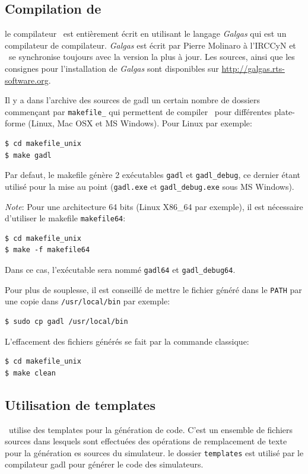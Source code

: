 \subsection{Compilation de \gadl}
le compilateur \gadl\ est entièrement écrit en utilisant le langage \emph{Galgas} qui est un compilateur de compilateur. \emph{Galgas} est écrit par Pierre Molinaro à l'IRCCyN et \gadl\ se synchronise toujours avec la version la plus à jour. Les sources, ainsi que les consignes pour l'installation de \emph{Galgas} sont disponibles sur \url{http://galgas.rts-software.org}.

Il y a dans l'archive des sources de gadl un certain nombre de dossiers commençant par \texttt{makefile\_} qui permettent de compiler \gadl\ pour différentes plate-forme (Linux, Mac OSX et MS Windows). Pour Linux par exemple:
\begin{verbatim}
$ cd makefile_unix
$ make gadl
\end{verbatim}
Par defaut, le makefile génère 2 exécutables \texttt{gadl} et \texttt{gadl\_debug}, ce dernier étant utilisé pour la mise au point (\texttt{gadl.exe} et \texttt{gadl\_debug.exe} sous MS Windows).

\emph{Note}: Pour une architecture 64 bits (Linux X86\_64 par exemple), il est nécessaire d'utiliser le makefile \texttt{makefile64}:
\begin{verbatim}
$ cd makefile_unix
$ make -f makefile64
\end{verbatim}
Dans ce cas, l'exécutable sera nommé \texttt{gadl64} et \texttt{gadl\_debug64}.

Pour plus de souplesse, il est conseillé de mettre le fichier généré dans le \texttt{PATH} par une copie dans \texttt{/usr/local/bin} par exemple:
\begin{verbatim}
$ sudo cp gadl /usr/local/bin
\end{verbatim}

L'effacement des fichiers générés se fait par la commande classique:
\begin{verbatim}
$ cd makefile_unix
$ make clean
\end{verbatim}

\subsection{Utilisation de templates}
\gadl\ utilise des templates pour la génération de code. C'est un ensemble de fichiers sources dans lesquels sont effectuées des opérations de remplacement de texte pour la génération es sources du simulateur. le dossier \texttt{templates} est utilisé par le compilateur gadl pour générer le code des simulateurs. 

